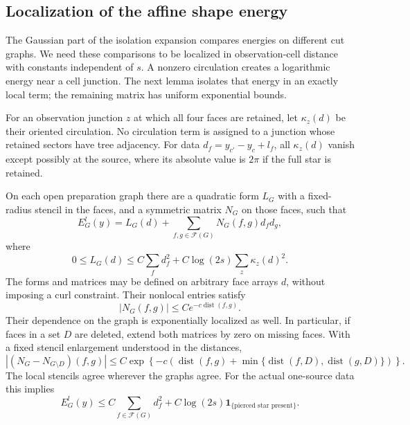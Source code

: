 \subsection{Localization of the affine shape energy}
\label{prep:gaussian-localization}

The Gaussian part of the isolation expansion compares energies on
different cut graphs.  We need these comparisons to be localized in
observation-cell distance with constants independent of $s$.  A nonzero
circulation creates a logarithmic energy near a cell junction.  The next
lemma isolates that energy in an exactly local term; the remaining
matrix has uniform exponential bounds.

For an observation junction $z$ at which all four faces are retained,
let $\kappa_z(d)$ be their oriented circulation.  No circulation term is
assigned to a junction whose retained sectors have tree adjacency.
For data $d_f=y_{c'}-y_c+l_f$, all $\kappa_z(d)$ vanish except possibly at
the source, where its absolute value is $2\pi$ if the full star is
retained.

\begin{lemma}\label{prep:localization}
On each open preparation graph there are a quadratic form $L_G$ with a
fixed-radius stencil in the faces, and a symmetric matrix $N_G$ on those
faces, such that
\begin{equation}\label{prep:shape-decomposition}
 E_G^l(y)=L_G(d)+\sum_{f,g\in\mathcal F(G)}N_G(f,g)d_fd_g,
\end{equation}
where
\begin{equation}\label{prep:trial-energy}
 0\le L_G(d)\le C\sum_fd_f^2
                       +C\log(2s)\sum_z\kappa_z(d)^2.
\end{equation}
The forms and matrices may be defined on arbitrary face arrays $d$,
without imposing a curl constraint.  Their nonlocal entries satisfy
\begin{equation}\label{prep:matrix-decay}
                         |N_G(f,g)|\le Ce^{-c\operatorname{dist}(f,g)}.
\end{equation}
Their dependence on the graph is exponentially localized as well.  In
particular, if faces in a set $D$ are deleted, extend both matrices by
zero on missing faces.  With a fixed stencil enlargement understood in
the distances,
\begin{equation}\label{prep:matrix-cut}
 |(N_G-N_{G\setminus D})(f,g)|
 \le C\exp\left\{-c\left(\operatorname{dist}(f,g)
       +\min\{\operatorname{dist}(f,D),\operatorname{dist}(g,D)\}\right)
                                                   \right\}.
\end{equation}
The local stencils agree wherever the graphs agree.  For the actual
one-source data this implies
\begin{equation}\label{eq:affine-shape-bound}
 E_G^l(y)\le C\sum_{f\in\mathcal F(G)}d_f^2
                  +C\log(2s)\mathbf 1_{\{\text{pierced star present}\}}.
\end{equation}
\end{lemma}

